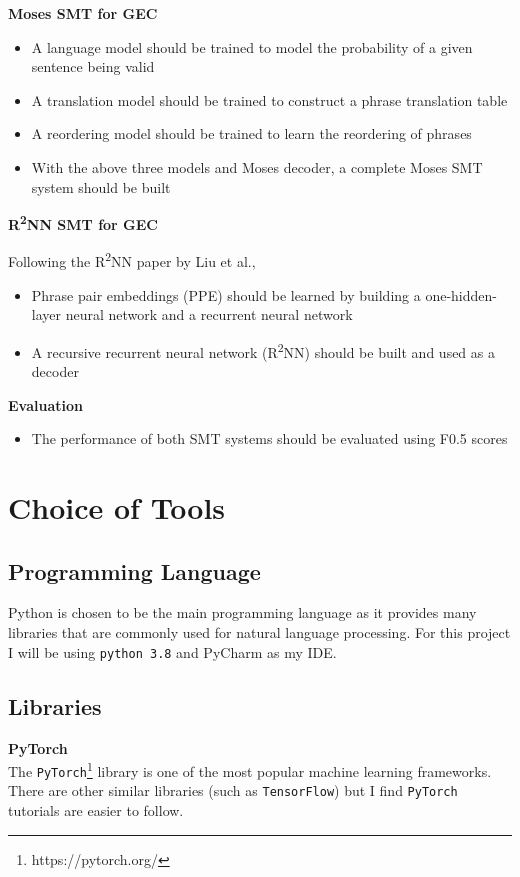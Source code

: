 \documentclass[12pt,a4paper,twoside,openright]{report}
\begin{document}
\textbf{Moses SMT for GEC}
\begin{itemize}
    \item A language model should be trained to model the probability of a given sentence being valid
    \item A translation model should be trained to construct a phrase translation table
    \item A reordering model should be trained to learn the reordering of phrases
    \item With the above three models and Moses decoder, a complete Moses SMT system should be built
\end{itemize}

\textbf{R\textsuperscript{2}NN SMT for GEC}

Following the R\textsuperscript{2}NN paper by Liu et al.\cite{r2nn},
\begin{itemize}
    \item Phrase pair embeddings (PPE) should be learned by building a one-hidden-layer neural network and a recurrent neural network
    \item A recursive recurrent neural network (R\textsuperscript{2}NN) should be built and used as a decoder
\end{itemize}

\textbf{Evaluation}
\begin{itemize}
    \item The performance of both SMT systems should be evaluated using F0.5 scores
\end{itemize}

\section{Choice of Tools}

\subsection{Programming Language}

Python is chosen to be the main programming language as it provides many libraries that are commonly used for natural language processing. For this project I will be using \texttt{python 3.8} and PyCharm as my IDE.

\subsection{Libraries}
\textbf{PyTorch} \\
The \texttt{PyTorch}\footnote{https://pytorch.org/} library is one of the most popular machine learning frameworks. There are other similar libraries (such as \texttt{TensorFlow}) but I find \texttt{PyTorch} tutorials are easier to follow.
\end{document}
